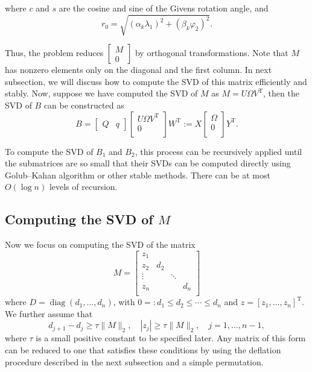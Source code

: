 \documentclass[12pt]{article}
\newcommand{\op}{\operatorname}
\begin{document}
where \(c\) and \(s\) are the cosine and sine of the Givens rotation angle, and
\[
    r_0 = \sqrt{(\alpha_k \lambda_1)^2 + (\beta_k \varphi_2)^2}.
\]

Thus, the problem reduces \(\begin{bmatrix}
    M \\ 0 
\end{bmatrix}\) by orthogonal transformations. Note that \(M\) has nonzero elements only on the diagonal and the first column. In next subsection, we will discuss how to compute the SVD of this matrix efficiently and stably. Now, suppose we have computed the SVD of \(M\) as \(M = U \Omega V^{\op T}\), then the SVD of \(B\) can be constructed as
\[
    B = \begin{bmatrix}
        Q & q
    \end{bmatrix} \begin{bmatrix}
        U \Omega V^{\op T} \\
        0 \\
    \end{bmatrix} W^{\op T} := X \begin{bmatrix}
        \Omega \\
        0 \\
    \end{bmatrix} Y^{\op T}.
\]

To compute the SVD of \(B_1\) and \(B_2\), this process can be recursively applied until the submatrices are so small that their SVDs can be computed directly using Golub--Kahan algorithm or other stable methods. There can be at most \(O(\log n)\) levels of recursion.

\subsection{Computing the SVD of \(M\)}

Now we focus on computing the SVD of the matrix
\[
    M = \begin{bmatrix}
        z_1 \\
        z_2 & d_2 \\
        \vdots & & \ddots \\
        z_n & & & d_n \\
    \end{bmatrix}
\]
where \(D = \op{diag}(d_1, \ldots, d_n)\), with \(0 =: d_1 \leq d_2 \leq \cdots \leq d_n\) and \(z = [z_1, \ldots, z_n]^{\op T}\). We further assume that
\[
    d_{j+1} - d_j \geq \tau \|M\|_2, \quad |z_j| \geq \tau \|M\|_2, \quad j = 1, \ldots, n - 1, 
\]
where \(\tau\) is a small positive constant to be specified later. Any matrix of this form can be reduced to one that satisfies these conditions by using the deflation procedure described in the next subsection and a simple permutation.
\end{document}
